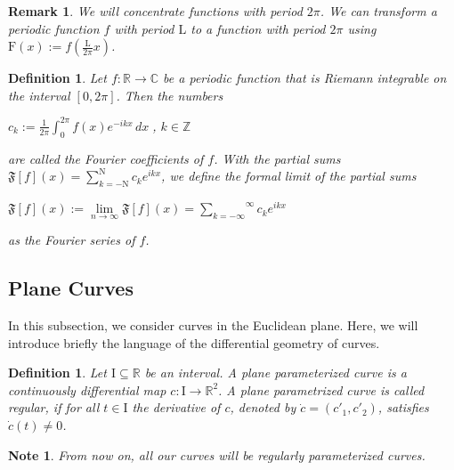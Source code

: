 \documentclass[a4paper]{book}
\newtheorem{remark}[theorem]{Remark}%
\newtheorem{note}[theorem]{Note}%
\newtheorem{definition}[theorem]{Definition}%
\numberwithin{theorem}{section}%
\begin{document}
\begin{remark}
    We will concentrate functions with period $2\pi$. We can transform a periodic function $f$ with period $\mathrm{L}$ to a function with period $2\pi$ using $\displaystyle \mathrm{F}(x):=f(\frac{\mathrm{L}}{2\pi}x)$.
\end{remark}

\begin{definition}
    Let $f:\mathbb{R}\to\mathbb{C}$ be a periodic function that is Riemann integrable on the interval $[0,2\pi]$. Then the numbers
    \begin{center}
        $\displaystyle c_{k}:=\frac{1}{2\pi}\int_{0}^{2\pi}f(x)e^{-ikx}\,dx\;$, $k\in\mathbb{Z}$
    \end{center}
    are called the \textit{Fourier coefficients} of $f$. With the partial sums $\mathfrak{F}[f](x)=\sum_{k=-\mathrm{N}}^{\mathrm{N}}c_{k}e^{ikx}$, we define the formal limit of the partial sums
    \begin{center}
        $\displaystyle \mathfrak{F}[f](x):=\underset{n\to\infty}{\lim}\mathfrak{F}[f](x)=\overset{\infty}{\underset{k=-\infty}{\sum}}c_{k}e^{ikx}$
    \end{center}
    as the \textit{Fourier series} of $f$.
\end{definition}

\subsection{Plane Curves}
In this subsection, we consider curves in the Euclidean plane. Here, we will introduce briefly the language of the differential geometry of curves.

\begin{definition}
    Let $\mathrm{I}\subseteq\mathbb{R}$ be an interval. A \textit{plane parameterized curve} is a continuously differential map $c:\mathrm{I}\to\mathbb{R}^{2}$. A plane parametrized curve is called \textit{regular}, if for all $t\in\mathrm{I}$ the derivative of $c$, denoted by $\dot{c}=(c'_{1},c'_{2})$, satisfies $\dot{c}(t)\neq0$.
\end{definition} 

\begin{note}
    From now on, all our curves will be regularly parameterized curves.
\end{note}
\end{document}
